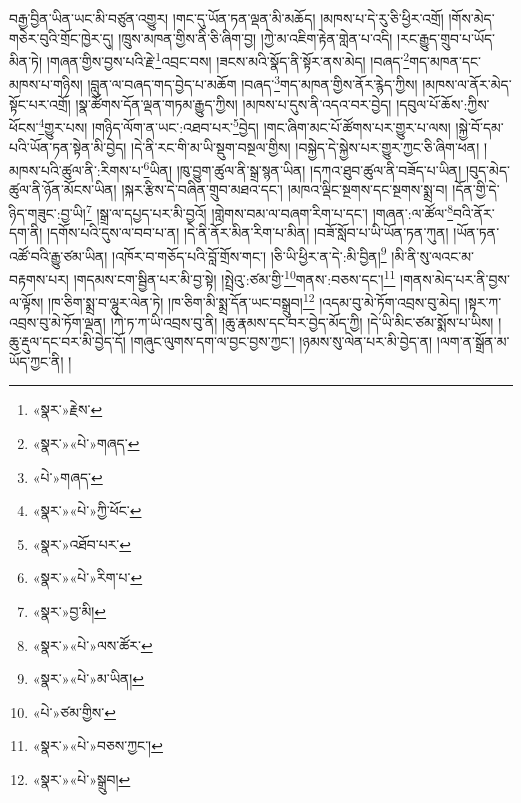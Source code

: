 བརྒྱ་བྱིན་ཡིན་ཡང་མི་བཙུན་འགྱུར། །གང་དུ་ཡོན་ཏན་ལྡན་མི་མཆོད། །མཁས་པ་དེ་རུ་ཅི་ཕྱིར་འགྲོ། །གོས་མེད་གཅེར་བུའི་གྲོང་ཁྱེར་དུ། །ཁྲུས་མཁན་གྱིས་ནི་ཅི་ཞིག་བྱ། །ཀྱེ་མ་འཇིག་རྟེན་གླེན་པ་འདི། །རང་རྒྱུད་གྲུབ་པ་ཡོད་མིན་ཏེ། །གཞན་གྱིས་བྱས་པའི་རྗེ་\footnote{«སྣར་»རྗེས་}འབྲང་བས། །ཟངས་མའི་སྣོད་ནི་སྟོར་ནས་མེད། །བཞད་\footnote{«སྣར་»«པེ་»གཞད་}གད་མཁན་དང་མཁས་པ་གཉིས། །བླུན་ལ་བཞད་གད་བྱེད་པ་མཆོག །བཞད་\footnote{«པེ་»གཞད་}གད་མཁན་གྱིས་ནོར་རྙེད་ཀྱིས། །མཁས་ལ་ནོར་མེད་སྟོང་པར་འགྲོ། །སྣ་ཚོགས་དོན་ལྡན་གཏམ་རྒྱུད་ཀྱིས། །མཁས་པ་དུས་ནི་འདའ་བར་བྱེད། །དབུལ་པོ་ཆོས་:ཀྱིས་ཕོངས་\footnote{«སྣར་»«པེ་»ཀྱི་ཕོང་}གྱུར་པས། །གཉིད་ལོག་ན་ཡང་:འཐབ་པར་\footnote{«སྣར་»འཐོབ་པར་}བྱེད། །གང་ཞིག་མང་པོ་ཚོགས་པར་གྱུར་པ་ལས། །སྐྱེ་བོ་དམ་པའི་ཡོན་ཏན་སྟེན་མི་བྱེད། །དེ་ནི་རང་གི་མ་ཡི་སྡུག་བསྔལ་གྱིས། །བསྐྱེད་དེ་སྐྱེས་པར་གྱུར་ཀྱང་ཅི་ཞིག་ཕན། །མཁས་པའི་ཚུལ་ནི་:རིགས་པ་\footnote{«སྣར་»«པེ་»རིག་པ་}ཡིན། །ཁུ་བྱུག་ཚུལ་ནི་སྒྲ་སྙན་ཡིན། །དཀའ་ཐུབ་ཚུལ་ནི་བཟོད་པ་ཡིན། །བུད་མེད་ཚུལ་ནི་ཉོན་མོངས་ཡིན། །སྐར་རྩིས་དེ་བཞིན་གྲུབ་མཐའ་དང་། །མཁའ་ལྡིང་སྔགས་དང་སྔགས་སྨྲ་བ། །དོན་གྱི་དེ་ཉིད་གཟུང་:བྱ་ཡི།\footnote{«སྣར་»བྱ་མི།} །སྒྲ་ལ་དཔྱད་པར་མི་བྱའོ། །གླེགས་བམ་ལ་བཞག་རིག་པ་དང་། །གཞན་:ལ་ཚོལ་\footnote{«སྣར་»«པེ་»ལས་ཚོར་}བའི་ནོར་དག་ནི། །དགོས་པའི་དུས་ལ་བབ་པ་ན། །དེ་ནི་ནོར་མིན་རིག་པ་མིན། །བཟོ་སློབ་པ་ཡི་ཡོན་ཏན་ཀུན། །ཡོན་ཏན་འཚོ་བའི་རྒྱུ་ཙམ་ཡིན། །འཁོར་བ་གཅོད་པའི་བློ་གྲོས་གང་། །ཅི་ཡི་ཕྱིར་ན་དེ་:མི་བྱིན།\footnote{«སྣར་»«པེ་»མ་ཡིན།} །མི་ནི་སུ་ལའང་མ་བརྟགས་པར། །གདམས་ངག་སྦྱིན་པར་མི་བྱ་སྟེ། །སྤྲེའུ་:ཙམ་གྱི་\footnote{«པེ་»ཙམ་གྱིས་}གནས་:བཅས་དང་།\footnote{«སྣར་»«པེ་»བཅས་ཀྱང་།} །གནས་མེད་པར་ནི་བྱས་ལ་ལྟོས། །ཁ་ཅིག་སྨྲ་བ་ལྷུར་ལེན་ཏེ། །ཁ་ཅིག་མི་སྨྲ་དོན་ཡང་བསྒྲུབ།\footnote{«སྣར་»«པེ་»སྒྲུབ།} །འདམ་བུ་མེ་ཏོག་འབྲས་བུ་མེད། །སྟར་ཀ་འབྲས་བུ་མེ་ཏོག་ལྡན། །ཀེ་ཏ་ཀ་ཡི་འབྲས་བུ་ནི། །ཆུ་རྣམས་དང་བར་བྱེད་མོད་ཀྱི། །དེ་ཡི་མིང་ཙམ་སྨོས་པ་ཡིས། །ཆུ་རྡུལ་དང་བར་མི་བྱེད་དོ། །གཞུང་ལུགས་དག་ལ་བྱང་བྱས་ཀྱང་། །ཉམས་སུ་ལེན་པར་མི་བྱེད་ན། །ལག་ན་སྒྲོན་མ་ཡོད་ཀྱང་ནི། །
